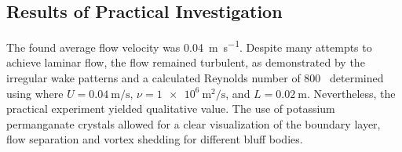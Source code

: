 \subsection{Results of Practical Investigation}
\label{sec:resultsPractical}
The found average flow velocity was \SI{0.04}{\meter\per\second}. Despite many attempts to achieve laminar flow, the flow remained turbulent, as demonstrated by the irregular wake patterns and a calculated Reynolds number of 800 \textemdash\ determined using  where $U = \SI{0.04}{\meter\per\second}$, $\nu = \SI{1e6}{\meter\squared\per\second}$, and $L = \SI{0.02}{\meter}$. Nevertheless, the practical experiment yielded qualitative value. The use of potassium permanganate crystals allowed for a clear visualization of the boundary layer, flow separation and vortex shedding for different bluff bodies.


